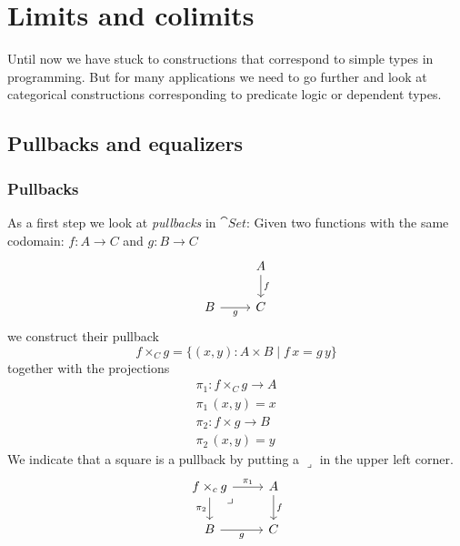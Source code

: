 \chapter{Limits and colimits}
\label{chap:limits-colimits}

Until now we have stuck to constructions that correspond to simple types in programming. But for many applications we need to go further and look at categorical constructions corresponding to predicate logic or dependent types.

\section{Pullbacks and equalizers}
\label{sec:pullbacks-equalizers}

\subsection*{Pullbacks}
\label{sec:pullbacks}

As a first step we look at \emph{pullbacks} in $\cat{Set}$: Given two functions with the same codomain: $f : A \to C$ and $g : B \to C$ 
\[\begin{tikzcd}
& A \arrow[d,"f"] \\
B \arrow[r,"g" below] &C 
\end{tikzcd}\]
we construct their pullback 
\[ f \times_C g = \{ (x,y) : A \times B \mid f\,x = g\,y \} \]
together with the projections
\begin{align*}
\pi_1 : f \times_C g \to A \\
\pi_1\,(x,y) = x \\
\pi_2 : f \times g \to B \\
\pi_2\,(x,y) = y 
\end{align*}
We indicate that a square is a pullback by putting a $\lrcorner$ in the upper left corner.
\[\begin{tikzcd}
f \times_c g \arrow[r,"\pi_1"] \arrow[d,"\pi_2" left] \arrow[dr, phantom, "\lrcorner", very near start]
    & A \arrow[d,"f"] \\
B \arrow[r,"g" below] &C 
\end{tikzcd}\]

